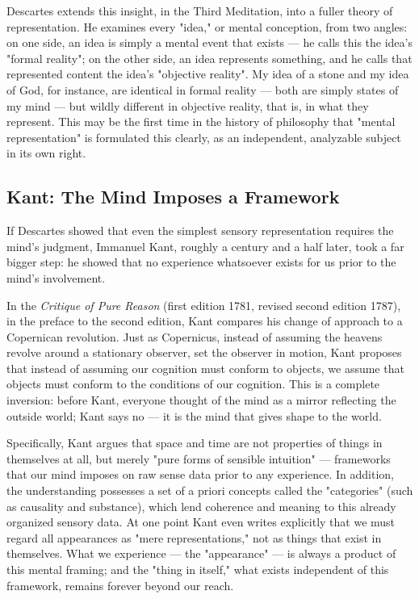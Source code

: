 Descartes extends this insight, in the Third Meditation, into a fuller theory of representation. He examines every "idea," or mental conception, from two angles: on one side, an idea is simply a mental event that exists --- he calls this the idea's "formal reality"; on the other side, an idea represents something, and he calls that represented content the idea's "objective reality"\autocite{sep-descartes-ideas}. My idea of a stone and my idea of God, for instance, are identical in formal reality --- both are simply states of my mind --- but wildly different in objective reality, that is, in what they represent. This may be the first time in the history of philosophy that "mental representation" is formulated this clearly, as an independent, analyzable subject in its own right.

\subsection{Kant: The Mind Imposes a Framework}
\label{sub:kant-framework}

If Descartes showed that even the simplest sensory representation requires the mind's judgment, Immanuel Kant, roughly a century and a half later, took a far bigger step: he showed that no experience whatsoever exists for us prior to the mind's involvement.

In the \textit{Critique of Pure Reason} (first edition 1781, revised second edition 1787), in the preface to the second edition, Kant compares his change of approach to a Copernican revolution. Just as Copernicus, instead of assuming the heavens revolve around a stationary observer, set the observer in motion, Kant proposes that instead of assuming our cognition must conform to objects, we assume that objects must conform to the conditions of our cognition\autocite{kant-critique}. This is a complete inversion: before Kant, everyone thought of the mind as a mirror reflecting the outside world; Kant says no --- it is the mind that gives shape to the world.

Specifically, Kant argues that space and time are not properties of things in themselves at all, but merely "pure forms of sensible intuition" --- frameworks that our mind imposes on raw sense data prior to any experience. In addition, the understanding possesses a set of a priori concepts called the "categories" (such as causality and substance), which lend coherence and meaning to this already organized sensory data. At one point Kant even writes explicitly that we must regard all appearances as "mere representations," not as things that exist in themselves\autocite{sep-kant-idealism}. What we experience --- the "appearance" --- is always a product of this mental framing; and the "thing in itself," what exists independent of this framework, remains forever beyond our reach.

